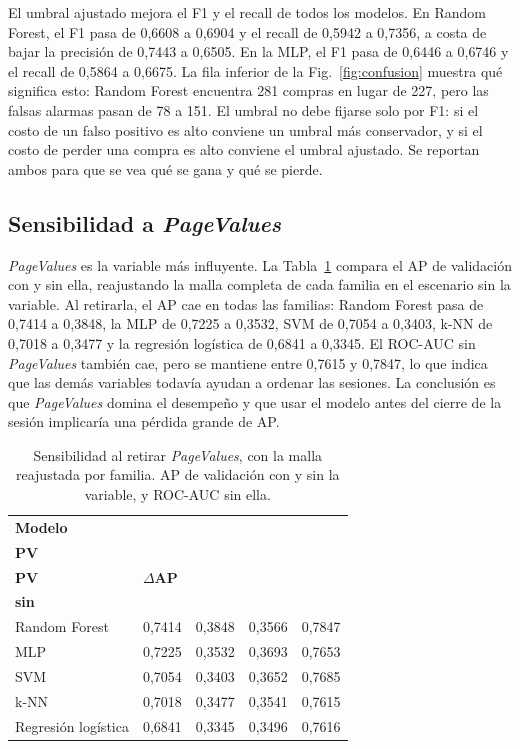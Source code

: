 \documentclass[journal]{IEEEtran}
\begin{document}
El umbral ajustado mejora el F1 y el recall de todos los modelos. En Random Forest, el F1
pasa de 0{,}6608 a 0{,}6904 y el recall de 0{,}5942 a 0{,}7356, a costa de bajar la
precisión de 0{,}7443 a 0{,}6505. En la MLP, el F1 pasa de 0{,}6446 a 0{,}6746 y el recall
de 0{,}5864 a 0{,}6675. La fila inferior de la Fig.~\ref{fig:confusion} muestra qué
significa esto: Random Forest encuentra 281 compras en lugar de 227, pero las falsas alarmas
pasan de 78 a 151. El umbral no debe fijarse solo por F1: si el costo de un falso
positivo es alto conviene un umbral más conservador, y si el costo de perder una compra es
alto conviene el umbral ajustado. Se reportan ambos para que se vea qué se gana y qué se pierde.

\subsection{Sensibilidad a \textit{PageValues}}
\label{sec:pagevalues}

\textit{PageValues} es la variable más influyente. La Tabla~\ref{tab:pagevalues} compara el
AP de validación con y sin ella, reajustando la malla completa de cada familia en el
escenario sin la variable. Al retirarla, el AP cae en todas las familias: Random Forest
pasa de 0{,}7414 a 0{,}3848, la MLP de 0{,}7225 a 0{,}3532, SVM de 0{,}7054 a 0{,}3403,
k-NN de 0{,}7018 a 0{,}3477 y la regresión logística de 0{,}6841 a 0{,}3345. El ROC-AUC
sin \textit{PageValues} también cae, pero se mantiene entre 0{,}7615 y 0{,}7847, lo que
indica que las demás variables todavía ayudan a ordenar las sesiones. La conclusión es que
\textit{PageValues} domina el desempeño y que usar el modelo antes del cierre de
la sesión implicaría una pérdida grande de AP.

\begin{table}[t]
\centering
\caption{Sensibilidad al retirar \textit{PageValues}, con la malla reajustada por familia.
AP de validación con y sin la variable, y ROC-AUC sin ella.}
\label{tab:pagevalues}
\scriptsize
\renewcommand{\arraystretch}{1.06}
\setlength{\tabcolsep}{2pt}
\begin{tabular}{p{2.4cm} p{1.35cm} p{1.35cm} p{1.0cm} p{1.45cm}}
\toprule
\textbf{Modelo} & \makecell{\textbf{AP con}\\\textbf{PV}} & \makecell{\textbf{AP sin}\\\textbf{PV}} & $\Delta$\textbf{AP} & \makecell{\textbf{ROC-AUC}\\\textbf{sin}} \\
\midrule
Random Forest & 0{,}7414 & 0{,}3848 & 0{,}3566 & 0{,}7847 \\
MLP & 0{,}7225 & 0{,}3532 & 0{,}3693 & 0{,}7653 \\
SVM & 0{,}7054 & 0{,}3403 & 0{,}3652 & 0{,}7685 \\
k-NN & 0{,}7018 & 0{,}3477 & 0{,}3541 & 0{,}7615 \\
Regresión logística & 0{,}6841 & 0{,}3345 & 0{,}3496 & 0{,}7616 \\
\bottomrule
\end{tabular}
\end{table}
\end{document}
